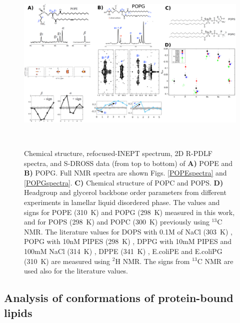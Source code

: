 \documentclass[aps,prl,superscriptaddress,twocolumn]{revtex4}
\begin{document}
\begin{figure}[]
  \centering
   \includegraphics[width=18.0cm]{./Figs/figure1.eps}
   \caption{\label{HGorderParameters}
     Chemical structure, refocused-INEPT spectrum, 2D R-PDLF spectra, and S-DROSS data (from top to bottom) of \textbf{A)} POPE  and \textbf{B)} POPG.
      Full NMR spectra are shown Figs. \ref{POPEspectra} and \ref{POPGspectra}.
     \textbf{C)} Chemical structure of POPC and POPS.
    \textbf{D)} Headgroup and glycerol backbone order parameters from different experiments in lamellar liquid disordered phase.
    The values and signs for POPE (310~K) and POPG (298~K)
    measured in this work, and for POPS (298~K) \cite{antila19} and POPC (300~K) \cite{ferreira13,ferreira16}
    previously using $^{13}$C NMR. The literature values for
    DOPS with 0.1M of NaCl (303~K) \cite{browning80},
    POPG with 10nM PIPES (298~K) \cite{borle85},
    DPPG with 10mM PIPES and 100mM NaCl (314~K) \cite{wohlgemuth80}, 
    DPPE (341~K) \cite{seelig76},
    E.coliPE and E.coliPG (310~K) \cite{gally81}
    are measured using $^2$H NMR. The signs from $^{13}$C NMR are used also for the literature values.
   }
    \\
\end{figure}


\subsection{Analysis of conformations of protein-bound lipids}
\end{document}
